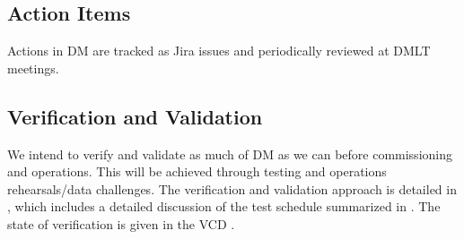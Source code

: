 \subsection{Action Items }
Actions in DM are tracked as Jira issues and periodically reviewed at DMLT  meetings.


\subsection {Verification and \gls{Validation} } \label{sect:vanv}

We intend to verify and validate as much of DM as we can before commissioning and operations.
This will be achieved through testing and operations rehearsals/data challenges.
The verification and validation approach is detailed in , which includes a detailed discussion of the test schedule summarized in .  The state of verification is given in the \gls{VCD} .
